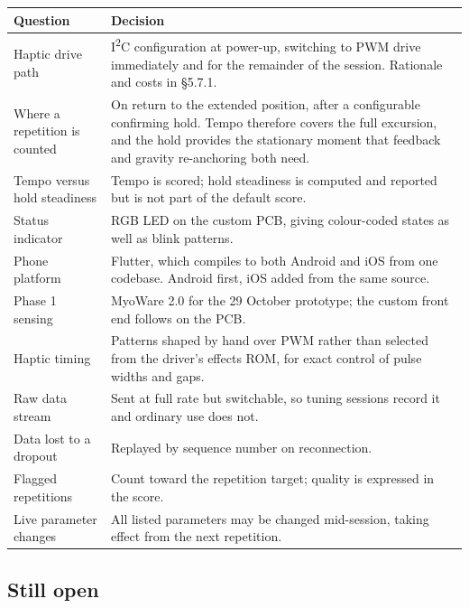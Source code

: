 \documentclass[11pt]{article}
\begin{document}
\begin{table}[H]
\centering\small
\begin{tabularx}{\linewidth}{@{}p{30mm} X@{}}
\toprule
\textbf{Question} & \textbf{Decision} \\
\midrule
Haptic drive path & I\textsuperscript{2}C configuration at power-up, switching to PWM drive immediately and for the remainder of the session. Rationale and costs in \S5.7.1. \\
Where a repetition is counted & On return to the extended position, after a configurable confirming hold. Tempo therefore covers the full excursion, and the hold provides the stationary moment that feedback and gravity re-anchoring both need. \\
Tempo versus hold steadiness & Tempo is scored; hold steadiness is computed and reported but is not part of the default score. \\
Status indicator & RGB LED on the custom PCB, giving colour-coded states as well as blink patterns. \\
Phone platform & Flutter, which compiles to both Android and iOS from one codebase. Android first, iOS added from the same source. \\
Phase 1 sensing & MyoWare 2.0 for the 29 October prototype; the custom front end follows on the PCB. \\
Haptic timing & Patterns shaped by hand over PWM rather than selected from the driver's effects ROM, for exact control of pulse widths and gaps. \\
Raw data stream & Sent at full rate but switchable, so tuning sessions record it and ordinary use does not. \\
Data lost to a dropout & Replayed by sequence number on reconnection. \\
Flagged repetitions & Count toward the repetition target; quality is expressed in the score. \\
Live parameter changes & All listed parameters may be changed mid-session, taking effect from the next repetition. \\
\bottomrule
\end{tabularx}
\end{table}

\subsection{Still open}
\end{document}
